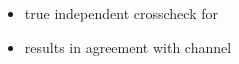 {\begin{minipage}{0.474\boxwidth}
\begin{center}
\end{center}
\vspace{-1.7em}
\begin{itemize}
\setlength\itemsep{0.01em}
\item true independent crosscheck for \BsToDspi
\item results in agreement with \BsToDspi channel
\end{itemize}

\vspace{0.1em}


\end{minipage}}
